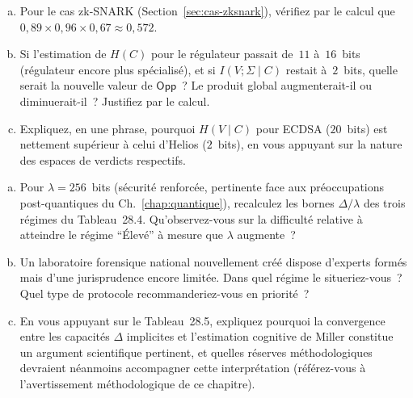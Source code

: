 \bigskip

\begin{boxexo}[title={\ding{45}\quad Exercice~28.1. Reproduire un calcul publié \niveaubase}]
\begin{enumerate}[(a)]
    \item Pour le cas zk-SNARK (Section~\ref{sec:cas-zksnark}),
          vérifiez par le calcul que
          $0{,}89 \times 0{,}96 \times 0{,}67 \approx 0{,}572$.
    \item Si l'estimation de $H(C)$ pour le régulateur passait
          de~$11$ à~$16$~bits (régulateur encore plus spécialisé),
          et si $I(V;\Sigma\mid C)$ restait à~$2$~bits, quelle
          serait la nouvelle valeur de $\mathsf{Opp}$~? Le produit
          global augmenterait-il ou diminuerait-il~? Justifiez par
          le calcul.
    \item Expliquez, en une phrase, pourquoi $H(V\mid C)$ pour
          ECDSA ($20$~bits) est nettement supérieur à celui d'Helios
          ($2$~bits), en vous appuyant sur la nature des espaces de
          verdicts respectifs.
\end{enumerate}
\end{boxexo}

\begin{boxexo}[title={\ding{45}\quad Exercice~28.2. Régimes de capacité appliqués \niveaumoyen}]
\begin{enumerate}[(a)]
    \item Pour $\lambda = 256$~bits (sécurité renforcée, pertinente
          face aux préoccupations post-quantiques du
          Ch.~\ref{chap:quantique}), recalculez les bornes
          $\Delta/\lambda$ des trois régimes du Tableau~28.4.
          Qu'observez-vous sur la difficulté relative à atteindre
          le régime ``Élevé'' à mesure que $\lambda$ augmente~?
    \item Un laboratoire forensique national nouvellement créé
          dispose d'experts formés mais d'une jurisprudence encore
          limitée. Dans quel régime le situeriez-vous~? Quel type
          de protocole recommanderiez-vous en priorité~?
    \item En vous appuyant sur le Tableau~28.5, expliquez pourquoi
          la convergence entre les capacités $\Delta$ implicites
          et l'estimation cognitive de Miller constitue un argument
          scientifique pertinent, et quelles réserves méthodologiques
          devraient néanmoins accompagner cette interprétation
          (référez-vous à l'avertissement méthodologique de ce
          chapitre).
\end{enumerate}
\end{boxexo}

